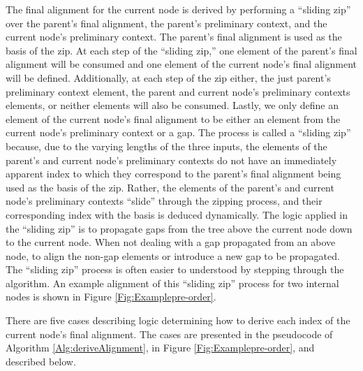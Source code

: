\documentclass{bmcart}
\begin{document}
The final alignment for the current node is derived by performing a ``sliding zip'' over the parent's final alignment, the parent's preliminary context, and the current node's preliminary context.
The parent's final alignment is used as the basis of the zip.
At each step of the ``sliding zip,'' one element of the parent's final alignment will be consumed and one element of the current node's final alignment will be defined.
Additionally, at each step of the zip either, the just parent's preliminary context element, the parent and current node's preliminary contexts elements, or neither elements will also be consumed.
Lastly, we only define an element of the current node's final alignment to be either an element from the current node's preliminary context or a gap.
The process is called a ``sliding zip'' because, due to the varying lengths of the three inputs, the elements of the parent's and current node's preliminary contexts do not have an immediately apparent index to which they correspond to the parent's final alignment being used as the basis of the zip.
Rather, the elements of the parent's and current node's preliminary contexts ``slide'' through the zipping process, and their corresponding index with the basis is deduced dynamically.
The logic applied in the ``sliding zip'' is to propagate gaps from the tree above the current node down to the current node. When not dealing with a gap propagated from an above node, to align the non-gap elements or introduce a new gap to be propagated.
The ``sliding zip'' process is often easier to  understood by stepping through the algorithm.
An example alignment of this ``sliding zip'' process for two internal nodes is shown in Figure \ref{Fig:Examplepre-order}.

There are five cases describing logic determining how to derive each index of the current node's final alignment. The cases are presented in the pseudocode of Algorithm \ref{Alg:deriveAlignment}, in Figure \ref{Fig:Examplepre-order}, and described below.
\end{document}
